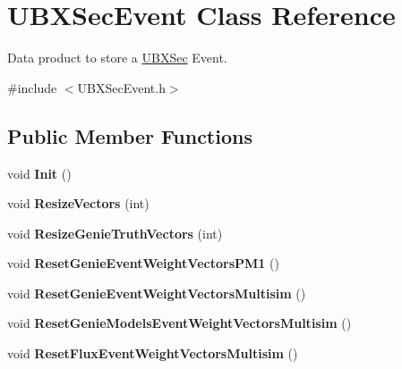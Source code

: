 \hypertarget{classUBXSecEvent}{\section{U\-B\-X\-Sec\-Event Class Reference}
\label{classUBXSecEvent}
}


Data product to store a \hyperlink{classUBXSec}{U\-B\-X\-Sec} Event.  




{\ttfamily \#include $<$U\-B\-X\-Sec\-Event.\-h$>$}

\subsection*{Public Member Functions}
\begin{DoxyCompactItemize}
\item 
\hypertarget{classUBXSecEvent_a57603c847176b408838d04e690b04828}{void {\bfseries Init} ()}\label{classUBXSecEvent_a57603c847176b408838d04e690b04828}

\item 
\hypertarget{classUBXSecEvent_a87228eb442b415053b9a9a070d29790b}{void {\bfseries Resize\-Vectors} (int)}\label{classUBXSecEvent_a87228eb442b415053b9a9a070d29790b}

\item 
\hypertarget{classUBXSecEvent_ad5715e19d69fe2815cdd650b7639c70a}{void {\bfseries Resize\-Genie\-Truth\-Vectors} (int)}\label{classUBXSecEvent_ad5715e19d69fe2815cdd650b7639c70a}

\item 
\hypertarget{classUBXSecEvent_a6b37b5a9d26a367edbe0a8fc0a69c103}{void {\bfseries Reset\-Genie\-Event\-Weight\-Vectors\-P\-M1} ()}\label{classUBXSecEvent_a6b37b5a9d26a367edbe0a8fc0a69c103}

\item 
\hypertarget{classUBXSecEvent_a95f1ed351bf03ff7cd59106d9af67548}{void {\bfseries Reset\-Genie\-Event\-Weight\-Vectors\-Multisim} ()}\label{classUBXSecEvent_a95f1ed351bf03ff7cd59106d9af67548}

\item 
\hypertarget{classUBXSecEvent_a91cd626260843b5ab8535ccd06302f2c}{void {\bfseries Reset\-Genie\-Models\-Event\-Weight\-Vectors\-Multisim} ()}\label{classUBXSecEvent_a91cd626260843b5ab8535ccd06302f2c}

\item 
\hypertarget{classUBXSecEvent_a4544b8b5f596e1fd314476ddc240ad56}{void {\bfseries Reset\-Flux\-Event\-Weight\-Vectors\-Multisim} ()}\label{classUBXSecEvent_a4544b8b5f596e1fd314476ddc240ad56}

\end{DoxyCompactItemize}
